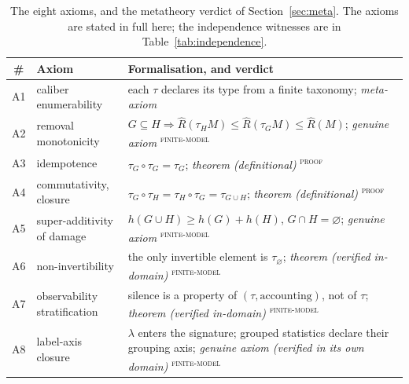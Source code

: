 \documentclass{article}
\newcommand{\Rhat}{\hat R}
\newcommand{\evtag}[1]{\textsuperscript{\textsc{#1}}}
\begin{document}
\begin{table}[t]
\centering
\small
\caption{The eight axioms, and the metatheory verdict of Section~\ref{sec:meta}. The axioms are stated in
full here; the independence witnesses are in Table~\ref{tab:independence}.}
\label{tab:axioms}
\begin{tabular}{@{}c l p{8.6cm}@{}}
\toprule
\# & Axiom & Formalisation, and verdict \\
\midrule
A1 & caliber enumerability & each $\tau$ declares its type from a finite taxonomy; \emph{meta-axiom} \\
A2 & removal monotonicity & $G\subseteq H\Rightarrow\Rhat(\tau_H M)\le\Rhat(\tau_G M)\le\Rhat(M)$; \emph{genuine axiom} \evtag{finite-model} \\
A3 & idempotence & $\tau_G\circ\tau_G=\tau_G$; \emph{theorem (definitional)} \evtag{proof} \\
A4 & commutativity, closure & $\tau_G\circ\tau_H=\tau_H\circ\tau_G=\tau_{G\cup H}$; \emph{theorem (definitional)} \evtag{proof} \\
A5 & super-additivity of damage & $h(G\cup H)\ge h(G)+h(H)$, $G\cap H=\varnothing$; \emph{genuine axiom} \evtag{finite-model} \\
A6 & non-invertibility & the only invertible element is $\tau_\varnothing$; \emph{theorem (verified in-domain)} \evtag{finite-model} \\
A7 & observability stratification & silence is a property of $(\tau,\text{accounting})$, not of $\tau$; \emph{theorem (verified in-domain)} \evtag{finite-model} \\
A8 & label-axis closure & $\lambda$ enters the signature; grouped statistics declare their grouping axis; \emph{genuine axiom (verified in its own domain)} \evtag{finite-model} \\
\bottomrule
\end{tabular}
\end{table}
\end{document}
